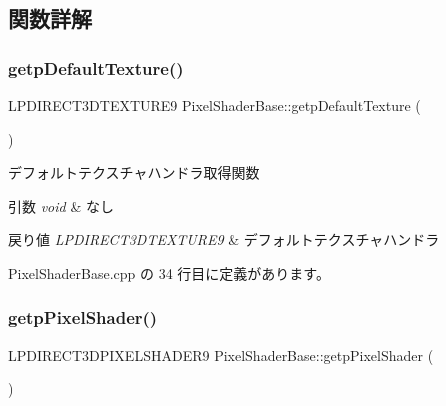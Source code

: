 \subsection{関数詳解}
\mbox{\label{class_pixel_shader_base_ad9a3a8966ab1e880df50596af730438e}} 
\subsubsection{\texorpdfstring{getp\+Default\+Texture()}{getpDefaultTexture()}}
{\footnotesize\ttfamily L\+P\+D\+I\+R\+E\+C\+T3\+D\+T\+E\+X\+T\+U\+R\+E9 Pixel\+Shader\+Base\+::getp\+Default\+Texture (\begin{DoxyParamCaption}{ }\end{DoxyParamCaption})}



デフォルトテクスチャハンドラ取得関数 


\begin{DoxyParams}{引数}
{\em void} & なし \\
\hline
\end{DoxyParams}

\begin{DoxyRetVals}{戻り値}
{\em L\+P\+D\+I\+R\+E\+C\+T3\+D\+T\+E\+X\+T\+U\+R\+E9} & デフォルトテクスチャハンドラ \\
\hline
\end{DoxyRetVals}


 Pixel\+Shader\+Base.\+cpp の 34 行目に定義があります。

\mbox{\label{class_pixel_shader_base_ac71a02e257267d6f64397b7e30bda88f}} 
\subsubsection{\texorpdfstring{getp\+Pixel\+Shader()}{getpPixelShader()}}
{\footnotesize\ttfamily L\+P\+D\+I\+R\+E\+C\+T3\+D\+P\+I\+X\+E\+L\+S\+H\+A\+D\+E\+R9 Pixel\+Shader\+Base\+::getp\+Pixel\+Shader (\begin{DoxyParamCaption}{ }\end{DoxyParamCaption})}



